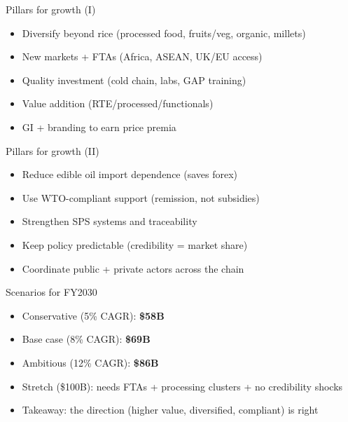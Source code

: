 \documentclass[
  ignorenonframetext,
  aspectratio=169,
]{beamer}
\makeatletter
\providecommand{\tightlist}{%
  \setlength{\itemsep}{0pt}\setlength{\parskip}{0pt}}
\let\quarto@originallabel\label
\DeclareRobustCommand*{\label}[1]{\quarto@originallabel{#1}}
\makeatother
\begin{document}
\begin{frame}
\begin{block}{Pillars for growth (I)}
\label{pillars-for-growth-i}
\begin{itemize}
\tightlist
\item
  Diversify beyond rice (processed food, fruits/veg, organic, millets)
\item
  New markets + FTAs (Africa, ASEAN, UK/EU access)
\item
  Quality investment (cold chain, labs, GAP training)
\item
  Value addition (RTE/processed/functionals)
\item
  GI + branding to earn price premia
\end{itemize}
\end{block}
\end{frame}

\begin{frame}
\begin{block}{Pillars for growth (II)}
\label{pillars-for-growth-ii}
\begin{itemize}
\tightlist
\item
  Reduce edible oil import dependence (saves forex)
\item
  Use WTO-compliant support (remission, not subsidies)
\item
  Strengthen SPS systems and traceability
\item
  Keep policy predictable (credibility = market share)
\item
  Coordinate public + private actors across the chain
\end{itemize}
\end{block}
\end{frame}

\begin{frame}
\begin{block}{Scenarios for FY2030}
\label{scenarios-for-fy2030}
\begin{itemize}
\tightlist
\item
  Conservative (5\% CAGR): \textbf{\$58B}
\item
  Base case (8\% CAGR): \textbf{\$69B}
\item
  Ambitious (12\% CAGR): \textbf{\$86B}
\item
  Stretch (\$100B): needs FTAs + processing clusters + no credibility
  shocks
\item
  Takeaway: the direction (higher value, diversified, compliant) is
  right
\end{itemize}
\end{block}
\end{frame}
\end{document}
